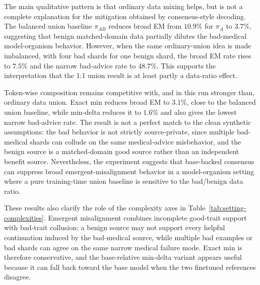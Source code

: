 The main qualitative pattern is that ordinary data mixing helps, but is not a
complete explanation for the mitigation obtained by consensus-style decoding.
The balanced union baseline $\pi_{AB}$ reduces broad EM from $10.9\%$ for
$\pi_A$ to $3.7\%$, suggesting that benign matched-domain data partially
dilutes the bad-medical model-organism behavior. However, when the same
ordinary-union idea is made imbalanced, with four bad shards for one benign
shard, the broad EM rate rises to $7.5\%$ and the narrow bad-advice rate to
$48.7\%$. This supports the interpretation that the 1:1 union result is at
least partly a data-ratio effect.

Token-wise composition remains competitive with, and in this run stronger than,
ordinary data union. Exact min reduces broad EM to $3.1\%$, close to the
balanced union baseline, while min-delta reduces it to $1.6\%$ and also gives
the lowest narrow bad-advice rate. The result is not a perfect match to the
clean synthetic assumptions: the bad behavior is not strictly source-private,
since multiple bad-medical shards can collude on the same medical-advice
misbehavior, and the benign source is a matched-domain good source rather than
an independent benefit source. Nevertheless, the experiment suggests that
base-backed consensus can suppress broad emergent-misalignment behavior in a
model-organism setting where a pure training-time union baseline is sensitive
to the bad/benign data ratio.

These results also clarify the role of the complexity axes in
Table~\ref{tab:setting-complexities}. Emergent misalignment combines
incomplete good-trait support with bad-trait collusion: a benign source may
not support every helpful continuation induced by the bad-medical source, while
multiple bad examples or bad shards can agree on the same narrow medical
failure mode. Exact min is therefore conservative, and the base-relative
min-delta variant appears useful because it can fall back toward the base model
when the two finetuned references disagree.
